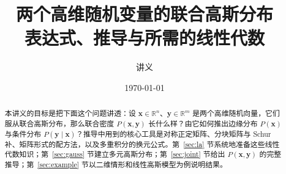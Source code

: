 \documentclass[UTF8,fontset=none,11pt]{ctexart}
\title{\textbf{两个高维随机变量的联合高斯分布}\\[0.4em]
  {\large 表达式、推导与所需的线性代数}}
\author{讲义}
\date{\today}
\theoremstyle{definition}
\theoremstyle{plain}
\newcommand{\R}{\mathbb{R}}
\newcommand{\vx}{\bm{x}}
\newcommand{\vy}{\bm{y}}
\begin{document}
\maketitle

\begin{abstract}
本讲义的目标是把下面这个问题讲透：设 $\vx\in\R^n$、$\vy\in\R^m$ 是两个高维随机向量，它们服从联合高斯分布，那么联合密度 $P(\vx,\vy)$ 长什么样？由它如何推出边缘分布 $P(\vx)$ 与条件分布 $P(\vy\mid\vx)$？推导中用到的核心工具是对称正定矩阵、分块矩阵与 Schur 补、矩阵形式的配方法，以及多重积分的换元公式。第~\ref{sec:la} 节系统地准备这些线性代数知识；第~\ref{sec:gauss} 节建立多元高斯分布；第~\ref{sec:joint} 节给出 $P(\vx,\vy)$ 的完整推导；第~\ref{sec:example} 节以二维情形和线性高斯模型为例说明结果。
\end{abstract}

\tableofcontents
\bigskip












\end{document}
